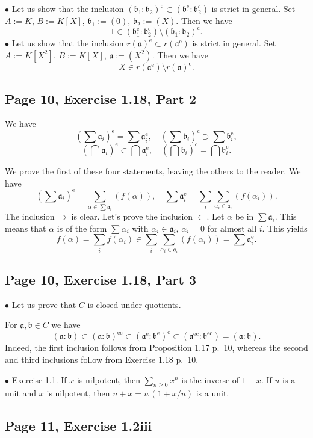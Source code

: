 \documentclass[parskip=half,fontsize=12pt]{scrartcl}%
\newcommand{\oo}{\operatorname}\newcommand{\ooo}{\operatorname*}
\newcommand{\mf}{\mathfrak}
\newcommand{\aaa}{\mf a}
\newcommand{\bbb}{\mf b}
\newcommand{\bu}{\bullet}
\begin{document}
$\bu$ Let us show that the inclusion $(\mf b_1:\mf b_2)^{\oo c}\subset(\mf b_1^{\oo c}:\mf b_2^{\oo c})$ is strict in general. Set $A:=K$, $B:=K[X]$, $\mf b_1:=(0)$, $\mf b_2:=(X)$. Then we have 
$$
1\in(\mf b_1^{\oo c}:\mf b_2^{\oo c})\setminus(\mf b_1:\mf b_2)^{\oo c}.
$$
$\bu$ Let us show that the inclusion $r(\mf a)^{\oo e}\subset r(\mf a^{\oo e})$ is strict in general. Set $A:=K[X^2]$, $B:=K[X]$, $\mf a:=(X^2)$. Then we have 
$$
X\in r(\mf a^{\oo e})\setminus r(\mf a)^{\oo e}.
$$

\subsection{Page 10, Exercise 1.18, Part 2}%

We have 
$$
\left(\sum\mf a_i\right)^{\oo e}=\sum\mf a_i^{\oo e},\quad\left(\sum\mf b_i\right)^{\oo c}\supset\sum\mf b_i^{\oo c},
$$
$$
\left(\bigcap\mf a_i\right)^{\oo e}\subset\bigcap\mf a_i^{\oo e},\quad\left(\bigcap\mf b_i\right)^{\oo c}=\bigcap\mf b_i^{\oo c}.
$$

We prove the first of these four statements, leaving the others to the reader. We have 
$$
\left(\sum\mf a_i\right)^{\oo e}=\sum_{\alpha\in\sum\mf a_i}(f(\alpha)),\quad\sum\mf a_i^{\oo e}=\sum_i\sum_{\alpha_i\in\mf a_i}(f(\alpha_i)).
$$ 
The inclusion $\supset$ is clear. Let's prove the inclusion $\subset$. Let $\alpha$ be in $\sum\mf a_i$. This means that $\alpha$ is of the form $\sum\alpha_i$ with $\alpha_i\in\mf a_i$, $\alpha_i=0$ for almost all $i$. This yields 
$$
f(\alpha)=\sum_if(\alpha_i)\in\sum_i\sum_{\alpha_i\in\mf a_i}(f(\alpha_i))=\sum\mf a_i^{\oo e}.
$$ 

\subsection{Page 10, Exercise 1.18, Part 3}%

$\bu$ Let us prove that $C$ is closed under quotients. 

For $\aaa,\bbb\in C$ we have
$$
(\aaa:\bbb)\subset(\aaa:\bbb)^{\oo{ec}}\subset(\aaa^{\oo e}:\bbb^{\oo e})^{\oo c}\subset(\aaa^{\oo{ec}}:\bbb^{\oo{ec}})=(\aaa:\bbb).
$$ 
Indeed, the first inclusion follows from Proposition 1.17 p.~10, whereas the second and third inclusions follow from Exercise 1.18 p.~10. 

$\bu$ Exercise 1.1. If $x$ is nilpotent, then $\sum_{n\ge0}x^n$ is the inverse of $1-x$. If $u$ is a unit and $x$ is nilpotent, then $u+x=u\,(1+x/u)$ is a unit.

\subsection{Page 11, Exercise 1.2iii}%
\end{document}
